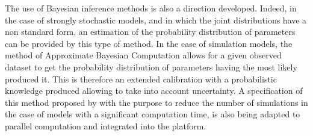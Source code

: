 \documentclass[10pt]{article}
\begin{document}
The use of Bayesian inference methods is also a direction developed. Indeed, in the case of strongly stochastic models, and in which the joint distributions have a non standard form, an estimation of the probability distribution of parameters can be provided by this type of method. In the case of simulation models, the method of Approximate Bayesian Computation \citep{csillery2010approximate} allows for a given observed dataset to get the probability distribution of parameters having the most likely produced it. This is therefore an extended calibration with a probabilistic knowledge produced allowing to take into account uncertainty. A specification of this method proposed by \cite{lenormand2013adaptive} with the purpose to reduce the number of simulations in the case of models with a significant computation time, is also being adapted to parallel computation and integrated into the platform.
\end{document}
